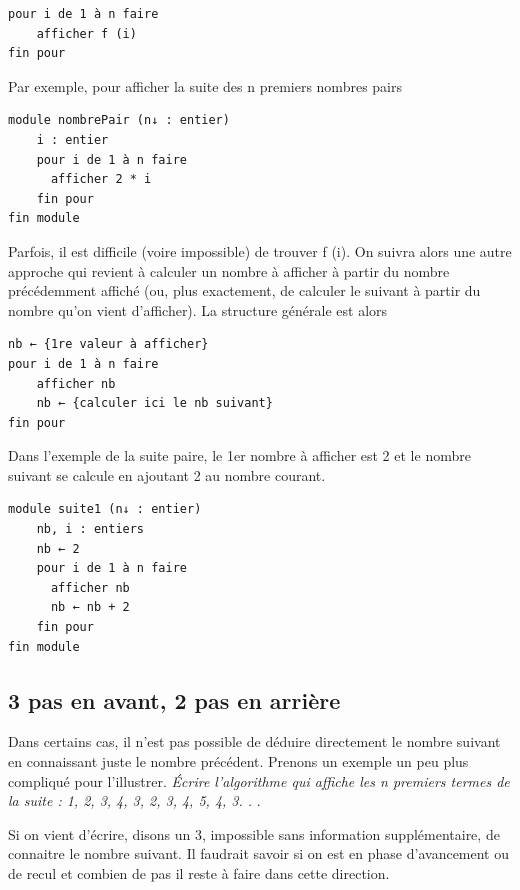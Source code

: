 \documentclass[11pt,a4paper]{article}
\begin{document}
            \par
        \begin{verbatim}
pour i de 1 à n faire
    afficher f (i)
fin pour
      \end{verbatim}Par exemple, pour afficher la suite des n premiers nombres pairs
            \par
        \begin{verbatim}
module nombrePair (n↓ : entier)
    i : entier
    pour i de 1 à n faire
      afficher 2 * i
    fin pour
fin module
      \end{verbatim}
        Parfois, il est difficile (voire impossible) de trouver f (i). On suivra alors une autre approche
        qui revient \`a calculer un nombre \`a afficher \`a partir du nombre pr\'ec\'edemment affich\'e (ou, plus
        exactement, de calculer le suivant \`a partir du nombre qu'on vient d'afficher). La structure
        g\'en\'erale est alors
      
            \par
        \begin{verbatim}
nb ← {1re valeur à afficher}
pour i de 1 à n faire
    afficher nb
    nb ← {calculer ici le nb suivant}
fin pour
      \end{verbatim}
        Dans l'exemple de la suite paire, le 1er nombre \`a afficher est 
        2 et le nombre suivant se calcule en ajoutant 2 au nombre courant.
      
            \par
        \begin{verbatim}
module suite1 (n↓ : entier)
    nb, i : entiers
    nb ← 2
    pour i de 1 à n faire
      afficher nb
      nb ← nb + 2
    fin pour
fin module
      \end{verbatim}\subsection{3 pas en avant, 2 pas en arri\`ere}
		    Dans certains cas, il n'est pas possible de d\'eduire directement le nombre suivant en connaissant juste le nombre pr\'ec\'edent. 
		    Prenons un exemple un peu plus compliqu\'e pour l'illustrer.
		    \guillemotleft  \textit{\'Ecrire l'algorithme qui affiche les n premiers termes de la suite : 1, 2, 3, 4, 3, 2, 3, 4, 5, 4, 3. . }. \guillemotright 
      
            \par
        
        Si on vient d'\'ecrire, disons un 3, impossible sans information suppl\'ementaire, de connaitre
        le nombre suivant. Il faudrait savoir si on est en phase d'avancement ou de recul et combien
        de pas il reste \`a faire dans cette direction.
      
\end{document}
